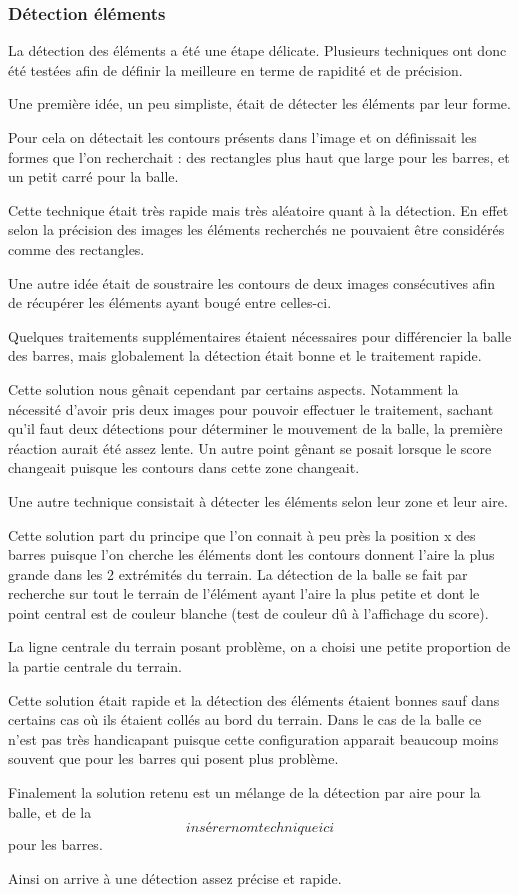 \subsubsection{Détection éléments}
\label{subs:Détection éléments}
\par La détection des éléments a été une étape délicate. Plusieurs techniques ont donc été testées afin de définir la meilleure en terme de rapidité et de précision.

\par Une première idée, un peu simpliste, était de détecter les éléments par leur forme. 
\par Pour cela on détectait les contours présents dans l'image et on définissait les formes que l'on recherchait : des rectangles plus haut que large pour les barres, et un petit carré pour la balle.
\par Cette technique était très rapide mais très aléatoire quant à la détection. En effet selon la précision des images  les éléments recherchés ne pouvaient être considérés comme des rectangles.

\par Une autre idée était de soustraire les contours de deux images consécutives afin de récupérer les éléments ayant bougé entre celles-ci.
\par Quelques traitements supplémentaires étaient nécessaires pour différencier la balle des barres, mais globalement la détection était bonne et le traitement rapide.
\par Cette solution nous gênait cependant par certains aspects. Notamment la nécessité d'avoir pris deux images pour pouvoir effectuer le traitement, sachant qu'il faut deux détections pour déterminer le mouvement de la balle, la première réaction aurait été assez lente. Un autre point gênant se posait lorsque le score changeait puisque les contours dans cette zone changeait.

\par Une autre technique consistait à détecter les éléments selon leur zone et leur aire.
\par Cette solution part du principe que l'on connait à peu près la position x des barres puisque l'on cherche les éléments dont les contours donnent l'aire la plus grande dans les 2 extrémités du terrain. La détection de la balle se fait par recherche sur tout le terrain de l'élément ayant l'aire la plus petite et dont le point central est de couleur blanche (test de couleur dû à l'affichage du score).
\par La ligne centrale du terrain posant problème, on a choisi une petite proportion de la partie centrale du terrain.
\par Cette solution était rapide et la détection des éléments étaient bonnes sauf dans certains cas où ils étaient collés au bord du terrain. Dans le cas de la balle ce n'est pas très handicapant puisque cette configuration apparait beaucoup moins souvent que pour les barres qui posent plus problème.



\par Finalement la solution retenu est un mélange de la détection par aire pour la balle, et de la $$ insérer nom technique ici $$ pour les barres.
\par Ainsi on arrive à une détection assez précise et rapide.
